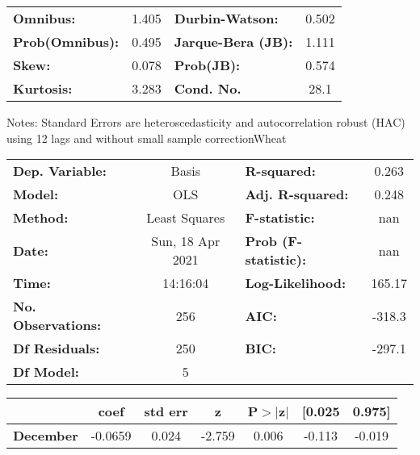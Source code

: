 \begin{center}
\begin{tabular}{lcccccc}
\bottomrule
\end{tabular}
\begin{tabular}{lclc}
\textbf{Omnibus:}       &  1.405 & \textbf{  Durbin-Watson:     } &    0.502  \\
\textbf{Prob(Omnibus):} &  0.495 & \textbf{  Jarque-Bera (JB):  } &    1.111  \\
\textbf{Skew:}          &  0.078 & \textbf{  Prob(JB):          } &    0.574  \\
\textbf{Kurtosis:}      &  3.283 & \textbf{  Cond. No.          } &     28.1  \\
\bottomrule
\end{tabular}
\end{center}

Notes: \newline
 [1] Standard Errors are heteroscedasticity and autocorrelation robust (HAC) using 12 lags and without small sample correctionWheat\begin{center}
\begin{tabular}{lclc}
\toprule
\textbf{Dep. Variable:}    &      Basis       & \textbf{  R-squared:         } &     0.263   \\
\textbf{Model:}            &       OLS        & \textbf{  Adj. R-squared:    } &     0.248   \\
\textbf{Method:}           &  Least Squares   & \textbf{  F-statistic:       } &       nan   \\
\textbf{Date:}             & Sun, 18 Apr 2021 & \textbf{  Prob (F-statistic):} &      nan    \\
\textbf{Time:}             &     14:16:04     & \textbf{  Log-Likelihood:    } &    165.17   \\
\textbf{No. Observations:} &         256      & \textbf{  AIC:               } &    -318.3   \\
\textbf{Df Residuals:}     &         250      & \textbf{  BIC:               } &    -297.1   \\
\textbf{Df Model:}         &           5      & \textbf{                     } &             \\
\bottomrule
\end{tabular}
\begin{tabular}{lcccccc}
                   & \textbf{coef} & \textbf{std err} & \textbf{z} & \textbf{P$> |$z$|$} & \textbf{[0.025} & \textbf{0.975]}  \\
\midrule
\textbf{December}  &      -0.0659  &        0.024     &    -2.759  &         0.006        &       -0.113    &       -0.019     \\

\end{tabular}
\end{center}
